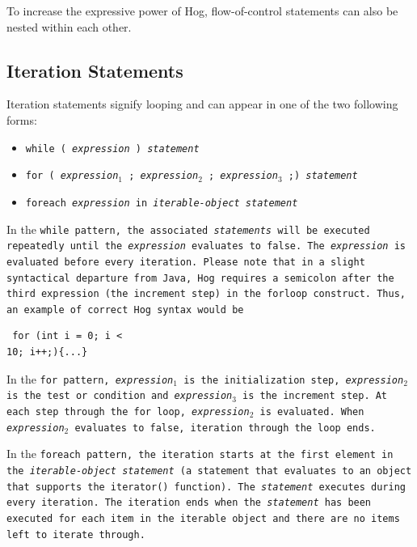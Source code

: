 \documentclass{book}
\begin{document}
To increase the expressive power of Hog, flow-of-control statements can also be
nested within each other.


\subsection{Iteration Statements} %
\label{sub:iteration_statements}

Iteration statements signify looping and can appear in one of the two following
forms:

\begin{itemize}
  \item[] \tt while ( \rm \emph{expression} \tt ) \rm \emph{statement}
  \item[] \tt for ( \rm \emph{expression}$_1$ \tt ; \rm \emph{expression}$_2$ \tt ; \rm \emph{expression}$_3$ \tt ;) \rm \emph{statement}
  \item[] \tt foreach \rm \emph{expression} \tt in \rm \emph{iterable-object statement}
\end{itemize}

In the \tt while \rm pattern, the associated \emph{statements} will be executed
repeatedly until the \emph{expression} evaluates to \tt false\rm. The
\emph{expression} is evaluated before every iteration. Please note that in a
slight syntactical departure from Java, Hog requires a semicolon after the
third expression (the increment step) in the \tt for\rm loop construct. Thus,
an example of correct Hog syntax would be \begin{verbatim} for (int i = 0; i <
10; i++;){...}\end{verbatim}

In the \tt for \rm pattern, \emph{expression}$_1$ is the initialization step,
\emph{expression}$_2$ is the test or condition and \emph{expression}$_3$ is the
increment step. At each step through the for loop, \emph{expression}$_2$ is
evaluated. When \emph{expression}$_2$ evaluates to false, iteration through the
loop ends.

In the \tt foreach \rm pattern, the iteration starts at the first element in the
\emph{iterable-object statement} (a statement that evaluates to an object that
supports the \tt iterator() \rm function). The \emph{statement} executes during
every iteration. The iteration ends when the \emph{statement} has been executed
for each item in the iterable object and there are no items left to iterate
through.
\end{document}
